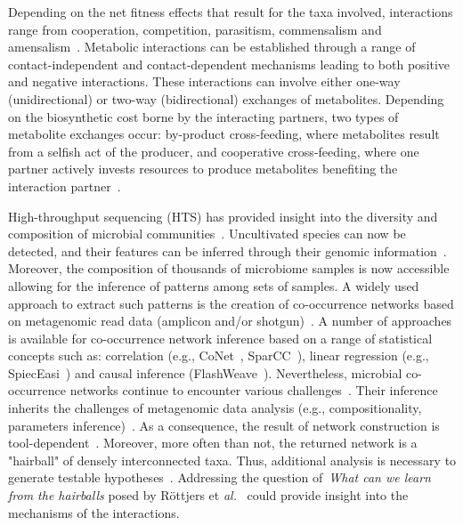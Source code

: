 \documentclass[sn-mathphys,Numbered]{sn-jnl}  %
\theoremstyle{thmstyleone}%
\theoremstyle{thmstyletwo}%
\theoremstyle{thmstylethree}%
\begin{document}
    Depending on the net fitness effects that result for the taxa involved, interactions range from cooperation, competition, parasitism, commensalism and amensalism~\cite{faust2012microbialReviewInteractions}.
    Metabolic interactions can be established through a range of contact-independent and contact-dependent mechanisms leading to both positive and negative interactions. 
    These interactions can involve either one-way (unidirectional) or two-way (bidirectional) exchanges of metabolites.
    Depending on the biosynthetic cost borne by the interacting partners, two types of metabolite exchanges occur: by-product cross-feeding, where metabolites result from a selfish act of the producer, and cooperative cross-feeding, where one partner actively invests resources to produce metabolites benefiting the interaction partner~\cite{d2018ecology}.


    High-throughput sequencing (HTS) has provided insight into the diversity and composition of microbial communities~\cite{elixir_microbiome}. %
    Uncultivated species can now be detected, and their features can be inferred through their genomic information~\cite{hug2016new}.
    Moreover, the composition of thousands of microbiome samples is now accessible allowing for the inference of patterns among sets of samples.
    A widely used approach to extract such patterns is the creation of co-occurrence networks based on metagenomic read data (amplicon and/or shotgun)~\cite{matchado2021network}. 
    A number of approaches is available for co-occurrence network inference based on a range of statistical concepts such as: correlation (e.g., CoNet~\cite{faust2012microbial}, SparCC~\cite{friedman2012inferring}), linear regression (e.g., SpiecEasi~\cite{kurtz2015sparse}) and causal inference (FlashWeave~\cite{flashweave_cite}).
    Nevertheless, microbial co-occurrence networks continue to encounter various challenges~\cite{faust2021open}.
    Their inference inherits the challenges of metagenomic data analysis (e.g., compositionality, parameters inference)~\cite{cao2017inferring}.
    As a consequence, the result of network construction is tool-dependent~\cite{kishore2023inferring, weiss2016correlation}.
    Moreover, more often than not, the returned network is a "hairball" of densely interconnected taxa.
    Thus, additional analysis is necessary to generate testable hypotheses~\cite{faust2021open}.
    Addressing the question of~\textit{What can we learn from the hairballs} posed by R{\"o}ttjers et \textit{al.}~\cite{rottjers2018hairballs} could provide insight into the mechanisms of the interactions.
\end{document}
